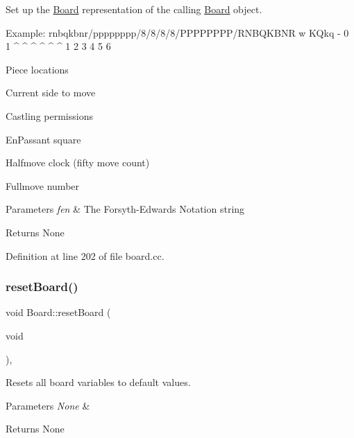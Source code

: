 Set up the \mbox{\hyperlink{classBoard}{Board}} representation of the calling \mbox{\hyperlink{classBoard}{Board}} object. 


\begin{DoxyPre}
Example: rnbqkbnr/pppppppp/8/8/8/8/PPPPPPPP/RNBQKBNR w KQkq - 0 1
                          ^                          ^  ^   ^ ^ ^
                          1                          2  3   4 5 6
     \end{DoxyPre}

\begin{DoxyEnumerate}
\item Piece locations
\item Current side to move
\item Castling permissions
\item En\+Passant square
\item Halfmove clock (fifty move count)
\item Fullmove number 
\begin{DoxyParams}{Parameters}
{\em fen} & The Forsyth-\/\+Edwards Notation string \\
\hline
\end{DoxyParams}
\begin{DoxyReturn}{Returns}
None 
\end{DoxyReturn}

\end{DoxyEnumerate}

Definition at line 202 of file board.\+cc.

\mbox{\label{classBoard_a72d31a84b6f4491b41ad249a047ffa6f}} 
\subsubsection{\texorpdfstring{reset\+Board()}{resetBoard()}}
{\footnotesize\ttfamily void Board\+::reset\+Board (\begin{DoxyParamCaption}\item[{void}]{ }\end{DoxyParamCaption})\hspace{0.3cm}{\ttfamily [private]}, {\ttfamily [noexcept]}}



Resets all board variables to default values. 


\begin{DoxyParams}{Parameters}
{\em None} & \\
\hline
\end{DoxyParams}
\begin{DoxyReturn}{Returns}
None 
\end{DoxyReturn}


